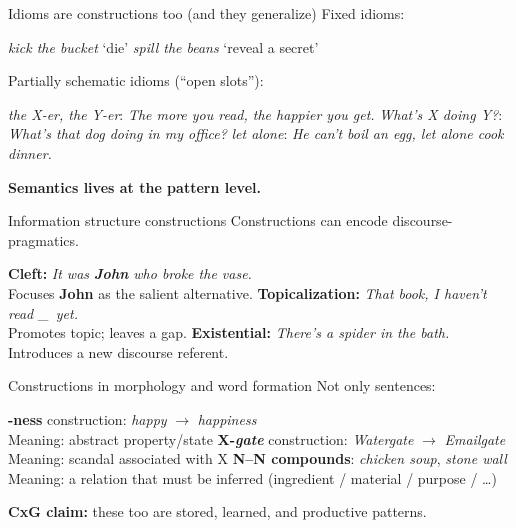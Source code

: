 \begin{frame}{Idioms are constructions too (and they generalize)}
\small
Fixed idioms:

\begin{exe}
  \ex \emph{kick the bucket} `die'
  \ex \emph{spill the beans} `reveal a secret'
\end{exe}


\vspace{0.5em}
Partially schematic idioms (``open slots''):

\begin{exe}
  \ex \emph{the X-er, the Y-er}: \emph{The more you read, the happier you get.}
  \ex \emph{What’s X doing Y?}: \emph{What’s that dog doing in my office?}
  \ex \emph{let alone}: \emph{He can’t boil an egg, let alone cook dinner.}
\end{exe}


\vspace{0.5em}
\textbf{Semantics lives at the pattern level.}
\end{frame}

\begin{frame}{Information structure constructions}
\small
Constructions can encode discourse-pragmatics.


\begin{exe}
  \ex \textbf{Cleft:} \emph{It was \textbf{John} who broke the vase.}\\
      Focuses \textbf{John} as the salient alternative.
  \ex \textbf{Topicalization:} \emph{That book, I haven’t read \_\ yet.}\\
      Promotes topic; leaves a gap.
  \ex \textbf{Existential:} \emph{There’s a spider in the bath.}\\
      Introduces a new discourse referent.
\end{exe}

\end{frame}

\begin{frame}{Constructions in morphology and word formation}
\small
Not only sentences:


\begin{exe}
  \ex \textbf{-ness} construction: \emph{happy} $\to$ \emph{happiness}\\
      Meaning: abstract property/state
  \ex \textbf{X-\emph{gate}} construction: \emph{Watergate} $\to$ \emph{Emailgate}\\
      Meaning: scandal associated with X
  \ex \textbf{N--N compounds}: \emph{chicken soup}, \emph{stone wall}\\
      Meaning: a relation that must be inferred (ingredient / material / purpose / \ldots)
\end{exe}


\vspace{0.5em}
\textbf{CxG claim:} these too are stored, learned, and productive patterns.
\end{frame}

